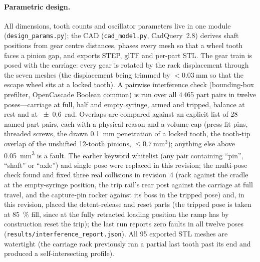 \documentclass[11pt,a4paper]{article}
\begin{document}
\paragraph{Parametric design.} All dimensions, tooth counts and oscillator parameters live in one module (\texttt{design\_params.py}); the CAD (\texttt{cad\_model.py}, CadQuery~2.8) derives shaft positions from gear centre distances, phases every mesh so that a wheel tooth faces a pinion gap, and exports STEP, glTF and per-part STL. The gear train is posed with the carriage: every gear is rotated by the rack displacement through the seven meshes (the displacement being trimmed by $<\SI{0.03}{\milli\metre}$ so that the escape wheel sits at a locked tooth). A pairwise interference check (bounding-box prefilter, OpenCascade Boolean common) is run over all 4\,465 part pairs in twelve poses---carriage at full, half and empty syringe, armed and tripped, balance at rest and at \SI{\pm 0.6}{\radian}. Overlaps are compared against an explicit list of 28 named part pairs, each with a physical reason and a volume cap (press-fit pins, threaded screws, the drawn \SI{0.1}{\milli\metre} penetration of a locked tooth, the tooth-tip overlap of the unshifted 12-tooth pinions, $\leq\SI{0.7}{\milli\metre\cubed}$); anything else above \SI{0.05}{\milli\metre\cubed} is a fault. The earlier keyword whitelist (any pair containing ``pin'', ``shaft'' or ``axle'') and single pose were replaced in this revision; the multi-pose check found and fixed three real collisions in revision~4 (rack against the cradle at the empty-syringe position, the trip rail's rear post against the carriage at full travel, and the capture-pin rocker against its boss in the tripped pose) and, in this revision, placed the detent-release and reset parts (the tripped pose is taken at \SI{85}{\percent} fill, since at the fully retracted loading position the ramp has by construction reset the trip); the last run reports zero faults in all twelve poses (\texttt{results/interference\_report.json}). All 95 exported STL meshes are watertight (the carriage rack previously ran a partial last tooth past its end and produced a self-intersecting profile).
\end{document}
